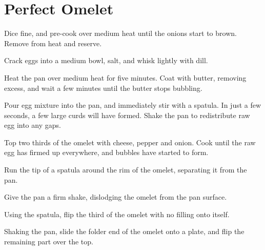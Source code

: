 
\section{Perfect Omelet}
\begin{recipe}



Dice fine, and pre-cook over medium heat until the onions start to brown. Remove from heat and reserve.


Crack eggs into a medium bowl, salt, and whisk lightly with dill.


Heat the pan over medium heat for five minutes. Coat with butter, removing excess, and wait a few minutes until the butter stops bubbling.

Pour egg mixture into the pan, and immediately stir with a spatula. In just a few seconds, a few large curds will have formed. Shake the pan to redistribute raw egg into any gaps.


Top two thirds of the omelet with cheese, pepper and onion. Cook until the raw egg has firmed up everywhere, and bubbles have started to form.

Run the tip of a spatula around the rim of the omelet, separating it from the pan.

Give the pan a firm shake, dislodging the omelet from the pan surface.

Using the spatula, flip the third of the omelet with no filling onto itself.

Shaking the pan, slide the folder end of the omelet onto a plate, and flip the remaining part over the top.

\end{recipe}


